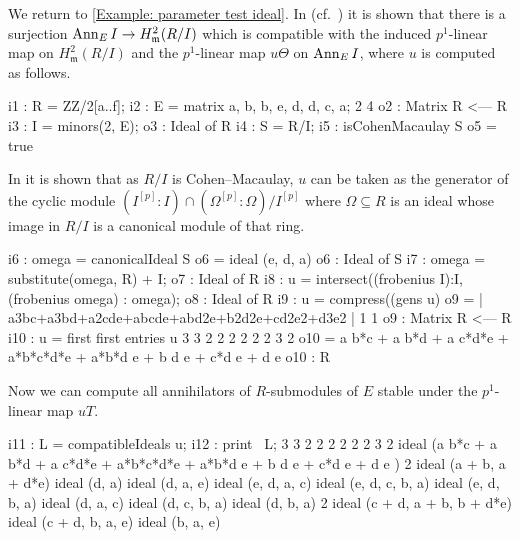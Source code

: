 \documentclass{amsart}
\begin{document}
\begin{example}
We return to \autoref{Example: parameter test ideal}.
In (cf.~\cite[\S 9]{KatzmanParameterTestIdealOfCMRings}) it is shown that
there is a surjection $\operatorname{{Ann}}_E I \rightarrow H^2_{\mathfrak{m}} (R/I)$
which is compatible  with the induced $p^1$-linear map on $H^2_{\mathfrak{m}} (R/I)$
and the $p^1$-linear map $u \Theta$ on $\operatorname{{Ann}}_E I$, where $u$ is computed as follows.

\medskip
{\small
\begin{MyVerbatim}
i1 : R = ZZ/2[a..f];
i2 : E = matrix {{a, b, b, e}, {d, d, c, a}};
             2       4
o2 : Matrix R  <--- R
i3 : I = minors(2, E);
o3 : Ideal of R
i4 : S = R/I;
i5 : isCohenMacaulay S
o5 = true
\end{MyVerbatim}
}\medskip

In \cite{KatzmanParameterTestIdealOfCMRings} it is shown that as $R/I$ is Cohen--Macaulay, $u$
can be taken as the generator of the cyclic module $(I^{[p]}:I) \cap (\Omega^{[p]}:\Omega)/I^{[p]}$
where $\Omega \subseteq R$ is an ideal whose image in $R/I$ is a canonical module of that ring.


\medskip
{\small
\begin{MyVerbatim}
i6 : omega = canonicalIdeal S
o6 = ideal (e, d, a)
o6 : Ideal of S
i7 : omega = substitute(omega, R) + I;
o7 : Ideal of R
i8 : u = intersect((frobenius I):I, (frobenius omega) : omega);
o8 : Ideal of R
i9 : u = compress((gens u) %
o9 = | a3bc+a3bd+a2cde+abcde+abd2e+b2d2e+cd2e2+d3e2 |
             1       1
o9 : Matrix R  <--- R
i10 : u = first first entries u
       3       3       2                         2     2 2       2 2    3 2
o10 = a b*c + a b*d + a c*d*e + a*b*c*d*e + a*b*d e + b d e + c*d e  + d e
o10 : R
\end{MyVerbatim}
}
\medskip

Now we can compute all annihilators of $R$-submodules of $E$ stable under the $p^1$-linear map $uT$.

\medskip
{\small
\begin{MyVerbatim}
i11 : L = compatibleIdeals u;
i12 : print \ L;
        3       3       2                         2     2 2       2 2    3 2
ideal (a b*c + a b*d + a c*d*e + a*b*c*d*e + a*b*d e + b d e + c*d e  + d e )
               2
ideal (a + b, a  + d*e)
ideal (d, a)
ideal (d, a, e)
ideal (e, d, a, c)
ideal (e, d, c, b, a)
ideal (e, d, b, a)
ideal (d, a, c)
ideal (d, c, b, a)
ideal (d, b, a)
                      2
ideal (c + d, a + b, b  + d*e)
ideal (c + d, b, a, e)
ideal (b, a, e)
\end{MyVerbatim}
}
\medskip


\end{example}
\end{document}
